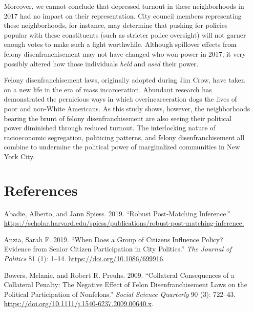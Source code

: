 \documentclass[12pt,]{article}
\begin{document}
Moreover, we cannot conclude that depressed turnout in these neighborhoods in 2017 had no impact on their representation. City council members representing these neighborhoods, for instance, may determine that pushing for policies popular with these constituents (such as stricter police oversight) will not garner enough votes to make such a fight worthwhile. Although spillover effects from felony disenfranchisement may not have changed who won power in 2017, it very possibly altered how those individuals \emph{held} and \emph{used} their power.

Felony disenfranchisement laws, originally adopted during Jim Crow, have taken on a new life in the era of mass incarceration. Abundant research has demonstrated the pernicious ways in which overincarceration dogs the lives of poor and non-White Americans. As this study shows, however, the neighborhoods bearing the brunt of felony disenfranchisement are also seeing their political power diminished through reduced turnout. The interlocking nature of racioeconomic segregation, politicing patterns, and felony disenfranchisement all combine to undermine the political power of marginalized communities in New York City.

\newpage

\hypertarget{references}{%
\section*{References}\label{references}}

\setlength{\parindent}{-0.5in}
\setlength{\leftskip}{0.5in}

\noindent

\hypertarget{refs}{}
\leavevmode\hypertarget{ref-Abadie2019}{}%
Abadie, Alberto, and Jann Spiess. 2019. ``Robust Post-Matching Inference.'' \url{https://scholar.harvard.edu/spiess/publications/robust-post-matching-inference.}

\leavevmode\hypertarget{ref-Anzia2019}{}%
Anzia, Sarah F. 2019. ``When Does a Group of Citizens Influence Policy? Evidence from Senior Citizen Participation in City Politics.'' \emph{The Journal of Politics} 81 (1): 1--14. \url{https://doi.org/10.1086/699916}.

\leavevmode\hypertarget{ref-Bowers2009}{}%
Bowers, Melanie, and Robert R. Preuhs. 2009. ``Collateral Consequences of a Collateral Penalty: The Negative Effect of Felon Disenfranchisement Laws on the Political Participation of Nonfelons.'' \emph{Social Science Quarterly} 90 (3): 722--43. \url{https://doi.org/10.1111/j.1540-6237.2009.00640.x}.
\end{document}
